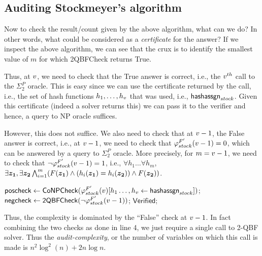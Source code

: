\subsection{Auditing Stockmeyer's algorithm}

Now to check the result/count given by the above algorithm, what can we do? In other words, what could be considered as a {\em certificate} for the answer? If we inspect the above algorithm, we can see that the crux is to identify the smallest value of $m$ for which 2QBFCheck returns True. 

Thus, at $v$, we need to check that the True answer is correct, i.e., the $v^{th}$ call to the $\Sigma_2^P$ oracle. This is easy since we can use the certificate returned by the call, i.e., the set of hash functions $h_1, \ldots, h_v$ that was used, i.e., $\mathsf{hashassgn}_{stock}$. Given this certificate (indeed a solver returns this) we can pass it to the verifier and hence, a query to NP oracle suffices. 

However, this does not suffice. We also need to check that at $v-1$, the False answer is correct, i.e., at $v-1$, we need to check that $\varphi_{stock}^{F'}(v-1)=0$, which can be answered by a query to $\Sigma_2^P$ oracle. More precisely, for $m=v-1$, we need to check that $\neg \varphi^{F'}_{stock}(v-1)=1$, i.e., $\forall h_1\ldots \forall h_m$, $\exists {\boldsymbol{z_1}}, \exists {\boldsymbol{z_2}} \bigwedge_{i=1}^m (F({\boldsymbol{z_1}})\land (h_i({\boldsymbol{z_1}})=h_i({\boldsymbol{z_2}}))\land F({\boldsymbol{z_2}}))$. 


\begin{algorithm}
	\caption{StockAudit$(F,\mathsf{Stock}(F))$}
	\begin{algorithmic}[1]
\State  $\mathsf{poscheck}\gets \mathsf{CoNPCheck} (\varphi_{stock}^{F'}(v)[h_1\ldots,h_v \gets \mathsf{hashassgn}_{stock}])$; \label{line:conpcheck}
                \State  $\mathsf{negcheck}\gets \mathsf{2QBFCheck}(\neg\varphi_{stock}^{F'}(v-1))$;\label{line:twoqbfcheck}   
		\label{line:equalcheck}                            
                \State \Return $\mathsf{Verified}$;
\EndIf
\end{algorithmic}
        \label{algo:stock-audit}
\end{algorithm}


Thus, the complexity is dominated by the ``False'' check at $v-1$. In fact combining the two checks as done in line 4, we just require a single call to 2-QBF solver. Thus the \emph{audit-complexity}, or the number of variables on which this call is made is $n^2\log^2(n)+ 2 n\log n$. 


